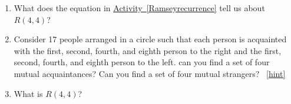\documentclass{book}
\begin{document}
\setcounter{project}{53}
\addtocounter{project}{-1}
\begin{activity}[]\label{Ramseybound2}
\leavevmode%
\begin{enumerate}[font=\bfseries,label=(\alph*),ref=\alph*]
\item\label{task-61} \hypertarget{p-450}{}%
What does the equation in \hyperref[Ramseyrecurrence]{Activity~\ref{Ramseyrecurrence}} tell us about \(R(4,4)\)?%
\item\label{task-62} \hypertarget{p-452}{}%
Consider 17 people arranged in a circle such that each person is acquainted with the first, second, fourth, and eighth person to the right and the first, second, fourth, and eighth person to the left.  can you find a set of four mutual acquaintances?  Can you find a set of four mutual strangers?%
~\hfill{\tiny\hyperlink{a-53.b}{[hint]}\hypertarget{q-53.b}{}}\item\label{task-63} \hypertarget{p-455}{}%
What is \(R(4,4)\)?%
\end{enumerate}
\end{activity}
\end{document}
